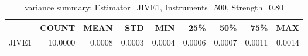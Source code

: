 \begin{table}[ht]
\centering
\caption{variance summary: Estimator=JIVE1, Instruments=500, Strength=0.80}
\begin{tabular}{lrrrrrrrr}
\toprule
 & COUNT & MEAN & STD & MIN & 25\% & 50\% & 75\% & MAX \\
\midrule
JIVE1 & 10.0000 & 0.0008 & 0.0003 & 0.0004 & 0.0006 & 0.0007 & 0.0011 & 0.0014 \\
\bottomrule
\end{tabular}
\end{table}
